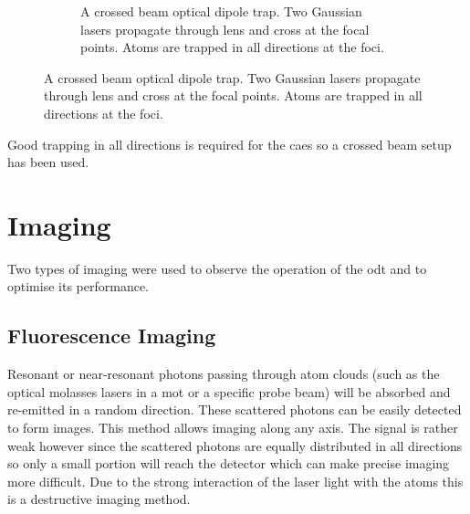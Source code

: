 \begin{figure}[h]
\begin{subfigure}[b]{0.5\textwidth}
\caption{A crossed beam optical dipole trap. Two Gaussian lasers propagate through lens and cross at the focal points. Atoms are trapped in all directions at the foci.}
\end{subfigure}
\end{figure}

Good trapping in all directions is required for the \gls{caes} so a crossed beam setup has been used.

\section{Imaging}

Two types of imaging were used to observe the operation of the \gls{odt} and to optimise its performance.

\subsection{Fluorescence Imaging}

Resonant or near-resonant photons passing through atom clouds (such as the optical molasses lasers in a \gls{mot} or a specific probe beam) will be absorbed and re-emitted in a random direction. These scattered photons can be easily detected to form images. This method allows imaging along any axis. The signal is rather weak however since the scattered photons are equally distributed in all directions so only a small portion will reach the detector which can make precise imaging more difficult. Due to the strong interaction of the laser light with the atoms this is a destructive imaging method.

